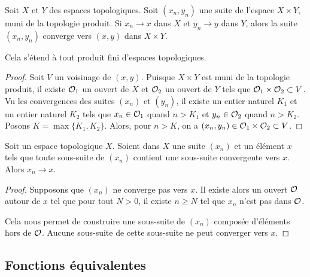 \begin{proposition}      \label{PROPooNRRIooCPesgO2}
  Soit \( X \) et \( Y \) des espaces topologiques. Soit \( (x_n, y_n) \) une suite de l'espace \( X \times Y \), muni de la topologie produit. Si \( x_n \to x \) dans \( X \) et \( y_n \to y \) dans \( Y \), alors la suite  \( (x_n, y_n) \) converge vers \( (x,y) \) dans \( X \times Y \).

  Cela s'étend à tout produit fini d'espaces topologiques.
\end{proposition}

\begin{proof}
  Soit \( V \) un voisinage de \( (x,y) \). Puisque \( X \times Y \) est muni de la topologie produit, il existe \( \mathcal{O}_1 \) un ouvert de \( X \) et  \( \mathcal{O}_2 \) un ouvert de \( Y \) tels que \(\mathcal{O}_1 \times \mathcal{O}_2 \subset V\). Vu les convergences des suites \( (x_n) \) et \( (y_n) \), il existe un entier naturel \( K_1 \) et un entier naturel \( K_2 \) tels que \( x_n \in \mathcal{O}_1 \) quand \( n > K_1 \) et  \( y_n \in \mathcal{O}_2 \) quand \( n > K_2 \). Posons \( K = \max \{ K_1, K_2 \}\). Alors, pour \( n > K \), on a \( (x_n, y_n) \in \mathcal{O}_1 \times \mathcal{O}_2 \subset V\). 
\end{proof}

\begin{lemma}        \label{LEMooSJKMooKSiEGq}
    Soit un espace topologique \( X\). Soient dans \( X\) une suite \( (x_n)\) et un élément \( x\) tels que toute sous-suite de \( (x_n)\) contient une sous-suite convergente vers \( x\). Alors \( x_n\to x\).
\end{lemma}

\begin{proof}
    Supposons que \( (x_n)\) ne converge pas vers \( x\). Il existe alors un ouvert \( \mathcal{O}\) autour de \( x\) tel que pour tout \( N>0\), il existe \( n\geq N\) tel que \( x_n\) n'est pas dans \( \mathcal{O}\).

    Cela nous permet de construire une sous-suite de \( (x_n)\) composée d'éléments hors de \( \mathcal{O}\). Aucune sous-suite de cette sous-suite ne peut converger vers \( x\).
\end{proof}

\subsection{Fonctions équivalentes}

